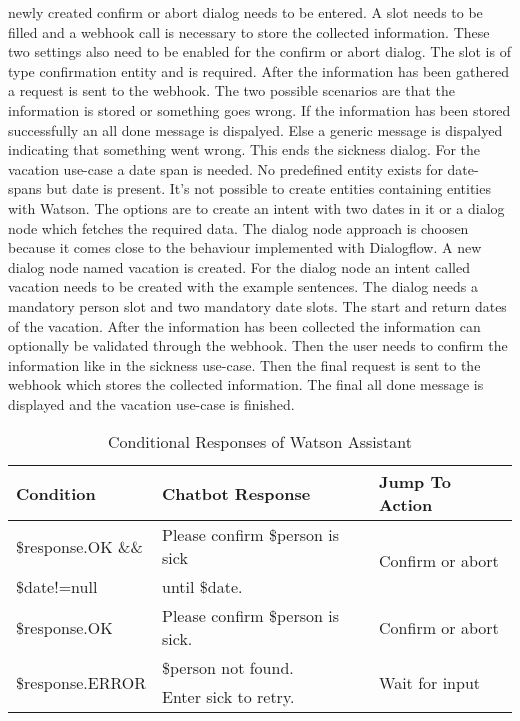 newly created confirm or abort dialog needs to be entered.
A slot needs to be filled and a webhook call is necessary to store the 
collected information.
These two settings also need to be enabled for the confirm or abort dialog.
The slot is of type confirmation entity and is required.
After the information has been gathered a request is sent to the webhook.
The two possible scenarios are that the information is stored or 
something goes wrong.
If the information has been stored successfully an all done message is dispalyed.
Else a generic message is dispalyed indicating that something went wrong.
This ends the sickness dialog.
For the vacation use-case a date span is needed.
No predefined entity exists for date-spans but date is present.
It's not possible to create entities containing entities with Watson.
The options are to create an intent with two dates in it or a dialog node 
which fetches the required data.
The dialog node approach is choosen because it comes close to the 
behaviour implemented with Dialogflow.
A new dialog node named vacation is created.
For the dialog node an intent called vacation needs to be created with 
the example sentences.
The dialog needs a mandatory person slot and two mandatory date slots.
The start and return dates of the vacation.
After the information has been collected the information can optionally 
be validated through the webhook.
Then the user needs to confirm the information like in the sickness use-case.
Then the final request is sent to the webhook which stores the 
collected information.
The final all done message is displayed and the vacation use-case is finished.

\begin{table}[H]
    \centering
    \begin{tabular}{ l | l | l  }
  Condition & Chatbot Response & Jump To Action \\ \hline \hline
  \$response.OK \&\& & Please confirm \$person is sick & \multirow{2}{*}{Confirm or abort} \\
  \$date!=null       & until \$date. & \\ \hline
  \$response.OK & Please confirm \$person is sick. & Confirm or abort \\ \hline
  \multirow{2}{*}{\$response.ERROR} & \$person not found. & \multirow{2}{*}{Wait for input} \\ 
  & Enter sick to retry. & \\ \hline

\end{tabular}
    \caption{Conditional Responses of Watson Assistant} \label{tab:watson_cond_response}
\end{table} \noindent


